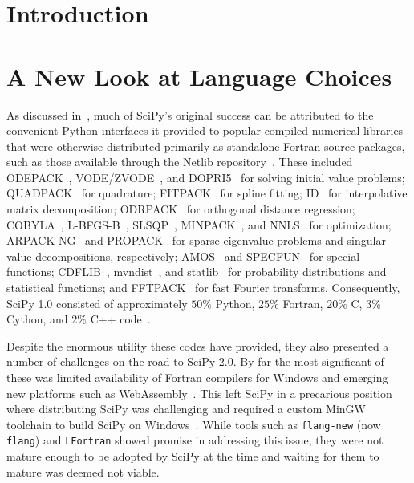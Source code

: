 \documentclass[acmsmall]{acmart}
\begin{document}
\maketitle


\section{Introduction}

\section{A New Look at Language Choices}

As discussed in~\cite{Virtanen2020}, much of SciPy's original success can be attributed
to the convenient Python interfaces it provided to popular compiled numerical libraries
that were otherwise distributed primarily as standalone Fortran source
packages, such as those available through the Netlib repository~\cite{netlib}.
These included
ODEPACK~\cite{Hindmarsh1983ODEPACK},
VODE/ZVODE~\cite{Brown1989}, and DOPRI5~\cite{Hairer1987} for solving initial value
problems; QUADPACK~\cite{Piessens1983} for quadrature; FITPACK~\cite{dierckx1995curve}
for spline fitting; ID~\cite{martinsson2008id,Halko2011} for interpolative
matrix decomposition; ODRPACK~\cite{Boggs1989}
for orthogonal distance regression; COBYLA~\cite{Powell1994}, L-BFGS-B~\cite{Morales2011},
SLSQP~\cite{Kraft1994,Kraft1988SQP}, MINPACK~\cite{More1980}, and
NNLS~\cite{Lawson1995} for optimization;
ARPACK-NG~\cite{Lehoucq2023ARPACKNG} and PROPACK~\cite{Larsen1998} for sparse eigenvalue problems
and singular value decompositions, respectively; AMOS~\cite{Amos1986} and
SPECFUN~\cite{Zhang1996} for special functions;
CDFLIB~\cite{Brown1994CDFLIB}, mvndist~\cite{Genz1992}, and
statlib~\cite{Dinneen1976,Best1975,Royston1995,Maclaren1985} for probability
distributions and statistical functions;
and FFTPACK~\cite{Swarztrauber1982} for fast Fourier transforms.
Consequently, SciPy 1.0 consisted of approximately $50\%$ Python, $25\%$ Fortran,
$20\%$ C, $3\%$ Cython, and $2\%$ C++ code~\cite{Virtanen2020}.

Despite the enormous utility these codes have provided, they also presented a number
of challenges on the road to SciPy 2.0. By far the most significant of these was
limited availability of Fortran compilers for Windows and
emerging new platforms such as WebAssembly~\cite{Haas2017}. This left SciPy
in a precarious position where distributing SciPy was challenging and required
a custom MinGW toolchain to build SciPy on Windows~\cite{obermeier2023eu}.
While tools such as \texttt{flang-new} (now \texttt{flang})
and \texttt{LFortran} showed promise in addressing this issue, they were not
mature enough to be adopted by SciPy at the time and waiting for them to mature was
deemed not viable.
\end{document}
